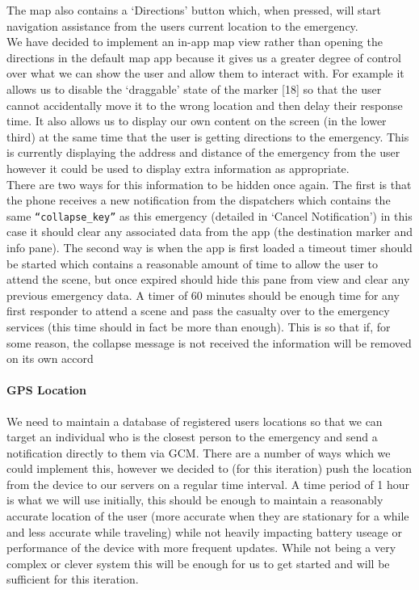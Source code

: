 \documentclass{article}
\begin{document}
The map also contains a ‘Directions’ button which, when pressed, will start navigation assistance from the users current location to the emergency.\\

We have decided to implement an in-app map view rather than opening the directions in the default map app because it gives us a greater degree of control over what we can show the user and allow them to interact with. For example it allows us to disable the ‘draggable’ state of the marker [18] so that the user cannot accidentally move it to the wrong location and then delay their response time. It also allows us to display our own content on the screen (in the lower third) at the same time that the user is getting directions to the emergency. This is currently displaying the address and distance of the emergency from the user however it could be used to display extra information as appropriate.\\

There are two ways for this information to be hidden once again. The first is that the phone receives a new notification from the dispatchers which contains the same \texttt{\color{OliveGreen}“collapse\_key”} as this emergency (detailed in ‘Cancel Notification’) in this case it should clear any associated data from the app (the destination marker and info pane). The second way is when the app is first loaded a timeout timer should be started which contains a reasonable amount of time to allow the user to attend the scene, but once expired should hide this pane from view and clear any previous emergency data. A timer of 60 minutes should be enough time for any first responder to attend a scene and pass the casualty over to the emergency services (this time should in fact be more than enough). This is so that if, for some reason, the collapse message is not received the information will be removed on its own accord\\

\paragraph{GPS Location}
We need to maintain a database of registered users locations so that we can target an individual who is the closest person to the emergency and send a notification directly to them via GCM. There are a number of ways which we could implement this, however we decided to (for this iteration) push the location from the device to our servers on a regular time interval. A time period of 1 hour is what we will use initially, this should be enough to maintain a reasonably accurate location of the user (more accurate when they are stationary for a while and less accurate while traveling) while not heavily impacting battery useage or performance of the device with more frequent updates. While not being a very complex or clever system this will be enough for us to get started and will be sufficient for this iteration.\\
\end{document}
